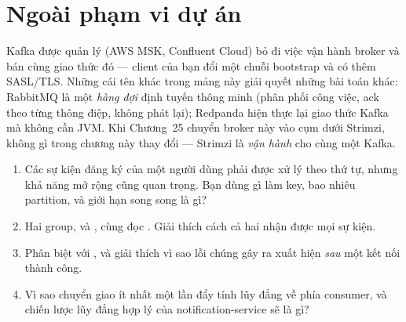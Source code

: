 \section{Ngoài phạm vi dự án}

Kafka được quản lý (AWS MSK, Confluent Cloud) bỏ đi việc vận hành broker
và bán cùng giao thức đó --- client của bạn đổi một chuỗi bootstrap và có
thêm SASL/TLS. Những cái tên khác trong mảng này giải quyết những bài
toán khác: RabbitMQ là một \emph{hàng đợi} định tuyến thông minh (phân
phối công việc, ack theo từng thông điệp, không phát lại); Redpanda
hiện thực lại giao thức Kafka mà không cần JVM. Khi Chương~25 chuyển
broker này vào cụm dưới Strimzi, không gì trong chương này thay đổi ---
Strimzi là \emph{vận hành} cho cùng một Kafka.

\begin{quiz}
\begin{enumerate}
  \item Các sự kiện đăng ký của một người dùng phải được xử lý theo thứ
  tự, nhưng khả năng mở rộng cũng quan trọng. Bạn dùng gì làm key, bao
  nhiêu partition, và giới hạn song song là gì?
  \item Hai group,  và , cùng
  đọc . Giải thích cách cả hai nhận được mọi sự
  kiện.
  \item Phân biệt  với , và
  giải thích vì sao lỗi chúng gây ra xuất hiện \emph{sau} một kết nối
  thành công.
  \item Vì sao chuyển giao ít nhất một lần đẩy tính lũy đẳng về phía
  consumer, và chiến lược lũy đẳng hợp lý của notification-service sẽ là
  gì?
\end{enumerate}
\end{quiz}
